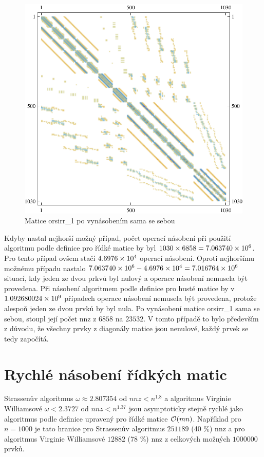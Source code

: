 \begin{figure}[htb]
	\includegraphics[width=1.0\textwidth]{./images/orsirr_1_mul}
	\caption{Matice orsirr\_1 po vynásobením sama se sebou}
	\label{fig:aftOrsirr1}
\end{figure}

Kdyby nastal nejhorší možný případ, počet operací násobení při použití algoritmu podle definice pro řídké matice by byl $1030 \times 6858 = 7.063740\times 10^{6}$. Pro tento případ ovšem stačí $4.6976\times 10^{4}$ operací násobení. Oproti nejhoršímu možnému případu nastalo $7.063740\times 10^{6} - 4.6976\times 10^{4} = 7.016764\times 10^{6}$ situací, kdy jeden ze dvou prkvů byl nulový a operace násobení nemusela být provedena. Při násobení algoritmem podle definice pro husté matice by v $1.092680024\times 10^{9}$ případech operace násobení nemusela být provedena, protože alespoň jeden ze dvou prvků by byl nula. Po vynásobení matice orsirr\_1 sama se sebou, stoupl její počet nnz z $6858$ na $23532$. V tomto případě to bylo především z důvodu, že všechny prvky z diagonály matice jsou nenulové, každý prvek se tedy započítá.

\label{fast-sparse}
\section{Rychlé násobení řídkých matic}

Strassenův algoritmus $\omega\approx2.807354$ od $nnz<n^{1.8}$ a algoritmus Virginie Williamsové $\omega<2.3727$ od $nnz<n^{1.37}$ jsou asymptoticky stejně rychlé jako algoritmus podle definice upravený pro řídké matice $\mathcal{O}(mn)$. Například pro $n=1000$ je tato hranice pro Strassenův algoritmus $251189$ (40 \%) nnz a pro algoritmus Virginie Williamsové $12882$ (78 \%) nnz z celkových možných $1000000$ prvků.

